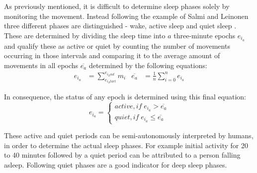 As previously mentioned, it is difficult to determine sleep phases solely by monitoring the movement. Instead following the example of Salmi and Leinonen three different phases are distinguished - wake, active sleep and quiet sleep \cite{salmi86}. These are determined by dividing the sleep time into $a$ three-minute epochs $e_{i_a}$ and qualify these as active or quiet by counting the number of movements occurring in those intervals and comparing it to the average amount of movements in all epochs $\overline{e_a}$ determined by the following equations:
\begin{align}
e_{i_a}&=\sum_{e_{i_Start}}^{e_{i_End}}{m_i} & \overline{e_a}&=\frac{1}{n}\sum_{i=0}^n{e_{i_a}}
\end{align}

In consequence, the status of any epoch is determined using this final equation:
\begin{equation}
e_{i_a}=\left\{\begin{matrix}
active,if \; e_{i_a}>\overline{e_a}\\ 
quiet,if \; e_{i_a}\leq \overline{e_a}
\end{matrix}\right.
\end{equation}

These active and quiet periods can be semi-autonomously interpreted by humans, in order to determine the actual sleep phases. For example initial activity for 20 to 40 minutes followed by a quiet period can be attributed to a person falling asleep. Following quiet phases are a good indicator for deep sleep phases.
 
